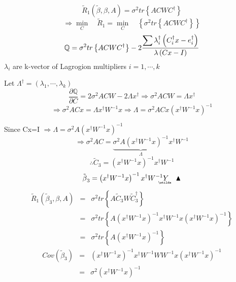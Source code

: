 \documentclass{article}
\begin{document}
\begin{equation*}
\tilde{R}_{1}\left( \tilde{\beta},\beta ,A\right) =\sigma ^{2}tr\left\{
ACWC^{\dagger }\right\}
\end{equation*}%
\begin{equation*}
\Rightarrow \underset{C}{\min }\quad \tilde{R}_{1}=\underset{C}{\min }\quad
\left\{ \sigma ^{2}tr\left\{ ACWC^{\dagger }\right\} \right\}
\end{equation*}%
\begin{equation*}
\mathbb{Q}
=\sigma ^{2}tr\left\{ ACWC^{\dagger }\right\} -2\frac{\dsum \lambda
_{i}^{\dagger }\left( C_{i}^{\dagger }x-e_{i}^{\dagger }\right) }{\lambda
\left( Cx-I\right) }
\end{equation*}%
$\lambda _{i}$ are k-vector of Lagrogion multipliers $i=1,\cdots ,k$

Let $\Lambda ^{\dagger }=\left( \lambda _{1},\cdots ,\lambda _{k}\right) $%
\begin{equation*}
\frac{\partial 
\mathbb{Q}
}{\partial C}=2\sigma ^{2}ACW-2\Lambda x^{\dagger }\Rightarrow \sigma
^{2}ACW=\Lambda x^{\dagger }
\end{equation*}%
\begin{equation*}
\Rightarrow \sigma ^{2}ACx=\Lambda x^{\dagger }W^{-1}x\Rightarrow \Lambda
=\sigma ^{2}ACx\left( x^{\dagger }W^{-1}x\right) ^{-1}
\end{equation*}

Since Cx=I $\Rightarrow \Lambda =\sigma ^{2}A\left( x^{\dagger
}W^{-1}x\right) ^{-1}$%
\begin{equation*}
\Rightarrow \sigma ^{2}AC=\underset{\Lambda }{\underbrace{\sigma ^{2}A\left(
x^{\dagger }W^{-1}x\right) ^{-1}}}x^{\dagger }W^{-1}
\end{equation*}%
\begin{equation*}
\therefore \tilde{C}_{3}=\left( x^{\dagger }W^{-1}x\right) ^{-1}x^{\dagger
}W^{-1}
\end{equation*}%
\begin{equation*}
\therefore \tilde{\beta}_{3}=\left( x^{\dagger }W^{-1}x\right)
^{-1}x^{\dagger }W^{-1}%
\underaccent{\wtilde}{Y}%
\quad \blacktriangle
\end{equation*}%
\begin{eqnarray*}
\tilde{R}_{1}\left( \tilde{\beta}_{3},\beta ,A\right) &=&\sigma
^{2}tr\left\{ A\tilde{C}_{3}W\tilde{C}_{3}^{\dagger }\right\} \\
&=&\sigma ^{2}tr\left\{ A\left( x^{\dagger }W^{-1}x\right) ^{-1}x^{\dagger
}W^{-1}x\left( x^{\dagger }W^{-1}x\right) ^{-1}\right\} \\
&=&\sigma ^{2}tr\left\{ A\left( x^{\dagger }W^{-1}x\right) ^{-1}\right\}
\end{eqnarray*}%
\begin{eqnarray*}
Cov\left( \tilde{\beta}_{3}\right) &=&\left( x^{\dagger }W^{-1}x\right)
^{-1}x^{\dagger }W^{-1}WW^{-1}x\left( x^{\dagger }W^{-1}x\right) ^{-1} \\
&=&\sigma ^{2}\left( x^{\dagger }W^{-1}x\right) ^{-1}
\end{eqnarray*}
\end{document}

